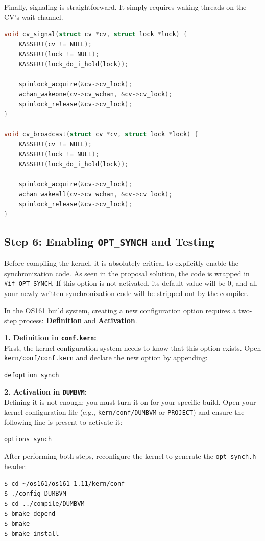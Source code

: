 Finally, signaling is straightforward. It simply requires waking threads on the CV's wait channel.
\begin{lstlisting}[language=C]
void cv_signal(struct cv *cv, struct lock *lock) {
    KASSERT(cv != NULL);
    KASSERT(lock != NULL);
    KASSERT(lock_do_i_hold(lock));
    
    spinlock_acquire(&cv->cv_lock);
    wchan_wakeone(cv->cv_wchan, &cv->cv_lock);
    spinlock_release(&cv->cv_lock);
}

void cv_broadcast(struct cv *cv, struct lock *lock) {
    KASSERT(cv != NULL);
    KASSERT(lock != NULL);
    KASSERT(lock_do_i_hold(lock));
    
    spinlock_acquire(&cv->cv_lock);
    wchan_wakeall(cv->cv_wchan, &cv->cv_lock);
    spinlock_release(&cv->cv_lock);
}
\end{lstlisting}

\subsection{Step 6: Enabling \texttt{OPT\_SYNCH} and Testing}
Before compiling the kernel, it is absolutely critical to explicitly enable the synchronization code. As seen in the proposal solution, the code is wrapped in \texttt{\#if OPT\_SYNCH}. If this option is not activated, its default value will be 0, and all your newly written synchronization code will be stripped out by the compiler.

In the OS161 build system, creating a new configuration option requires a two-step process: \textbf{Definition} and \textbf{Activation}.

\textbf{1. Definition in \texttt{conf.kern}:}\\
First, the kernel configuration system needs to know that this option exists. Open \texttt{kern/conf/conf.kern} and declare the new option by appending:
\begin{verbatim}
defoption synch
\end{verbatim}

\textbf{2. Activation in \texttt{DUMBVM}:}\\
Defining it is not enough; you must turn it on for your specific build. Open your kernel configuration file (e.g., \texttt{kern/conf/DUMBVM} or \texttt{PROJECT}) and ensure the following line is present to activate it:
\begin{verbatim}
options synch
\end{verbatim}

After performing both steps, reconfigure the kernel to generate the \texttt{opt-synch.h} header:
\begin{verbatim}
$ cd ~/os161/os161-1.11/kern/conf
$ ./config DUMBVM
$ cd ../compile/DUMBVM
$ bmake depend
$ bmake
$ bmake install
\end{verbatim}

